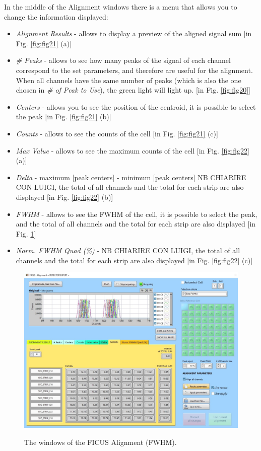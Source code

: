 \documentclass[a4paper,12pt,oneside,pdflatex,italian,final,twocolumn]{article}
\begin{document}
In the middle of the Alignment windows there is a menu that allows you to change the information displayed:
\begin{itemize}
    \item \textit{Alignment Results} - allows to display a preview of the aligned signal sum [in Fig. \ref{fig:fig21} (a)]
    \item \textit{\# Peaks} - allows to see how many peaks of the signal of each channel correspond to the set parameters, and therefore are useful for the alignment. When all channels have the same number of peaks (which is also the one chosen in \textit{# of Peak to Use}), the green light will light up. [in Fig. \ref{fig:fig20}]
    \item \textit{Centers} - allows you to see the position of the centroid, it is possible to select the peak [in Fig. \ref{fig:fig21} (b)]
    \item \textit{Counts} - allows to see the counts of the cell [in Fig. \ref{fig:fig21} (c)]
    \item \textit{Max Value} - allows to see the maximum counts of the cell [in Fig. \ref{fig:fig22} (a)]
    \item \textit{Delta} - maximum [peak centers] - minimum [peak centers] NB CHIARIRE CON LUIGI, the total of all channels and the total for each strip are also displayed [in Fig. \ref{fig:fig22} (b)]
    \item \textit{FWHM} -  allows to see the FWHM of the cell, it is possible to select the peak, and the total of all channels and the total for each strip are also displayed [in Fig. \ref{fig:fig19}]  
    \item \textit{Norm. FWHM Quad (\%)} - NB CHIARIRE CON LUIGI, the total of all channels and the total for each strip are also displayed [in Fig. \ref{fig:fig22} (c)]
\end{itemize}

\begin{figure}[h]
\centering
{\includegraphics[width=.7\textwidth]{Capture29.jpg}} \quad
\caption{The windows of the FICUS Alignment (FWHM).}\label{fig:fig19}
\end{figure}
\end{document}

